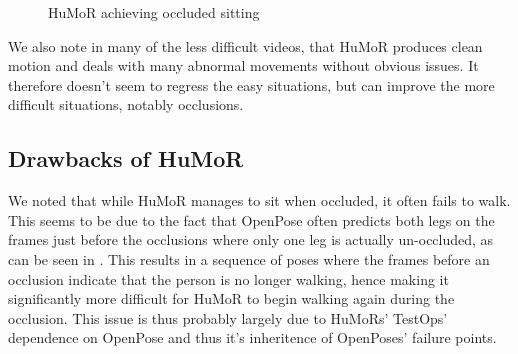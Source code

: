 \begin{figure}[!ht]
    \centering
    \hfil
    \hfil
    \caption{HuMoR achieving occluded sitting}
    \label{fig:humor_sitting}
\end{figure}

We also note in many of the less difficult videos, that HuMoR produces clean motion and deals with many abnormal movements without obvious issues. It therefore doesn't seem to regress the easy situations, but can improve the more difficult situations, notably occlusions.


\subsection{Drawbacks of HuMoR}

We noted that while HuMoR manages to sit when occluded, it often fails to walk. This seems to be due to the fact that OpenPose often predicts both legs on the frames just before the occlusions where only one leg is actually un-occluded, as can be seen in . This results in a sequence of poses where the frames before an occlusion indicate that the person is no longer walking, hence making it significantly more difficult for HuMoR to begin walking again during the occlusion. This issue is thus probably largely due to HuMoRs' TestOps' dependence on OpenPose and thus it's inheritence of OpenPoses' failure points.

